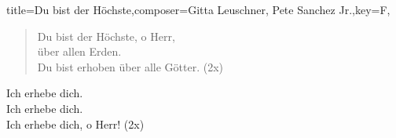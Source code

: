 \documentclass[]{leadsheet}
\begin{document}
\begin{song}{title={Du bist der Höchste},composer={Gitta Leuschner, Pete Sanchez Jr.},key={F},}

\begin{verse}
Du bist der Höchste, o Herr, \\
über allen Erden. \\
Du bist erhoben über alle Götter. (2x) \\
\end{verse}

\begin{chorus}
Ich erhebe dich. \\
Ich erhebe dich. \\
Ich erhebe dich, o Herr! (2x) \\
\end{chorus}

\end{song}
\end{document}
